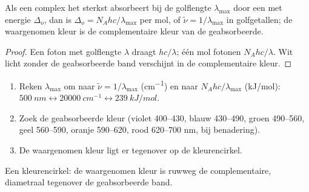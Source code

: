 \begin{proposition}\label{prop:b2:ligand-field:colour}
Als een complex het sterkst absorbeert bij de golflengte $\lambda_{\max}$ door een 
met energie $\Delta_o$, dan is $\Delta_o = N_Ahc/\lambda_{\max}$ per mol, of $\tilde\nu = 1/\lambda_{\max}$
in golfgetallen; de waargenomen kleur is de complementaire kleur van de geabsorbeerde.
\end{proposition}

\begin{proof}
Een foton met golflengte $\lambda$ draagt $hc/\lambda$; één mol fotonen $N_Ahc/\lambda$. Wit
licht zonder de geabsorbeerde band verschijnt in de complementaire kleur.
\end{proof}

\begin{method}\label{met:b2:ligand-field:colour}
\begin{enumerate}
  \item Reken $\lambda_{\max}$ om naar $\tilde\nu = 1/\lambda_{\max}$ (\unit{cm^{-1}}) en naar
        $N_Ahc/\lambda_{\max}$ (\unit{kJ/mol}): $\qty{500}{nm} \leftrightarrow \qty{20000}{cm^{-1}}
        \leftrightarrow \qty{239}{kJ/mol}$.
  \item Zoek de geabsorbeerde kleur (violet 400--430, blauw 430--490, groen 490--560, geel
        560--590, oranje 590--620, rood 620--700 nm, bij benadering).
  \item De waargenomen kleur ligt er tegenover op de kleurencirkel.
\end{enumerate}
\end{method}

\begin{omfigure}

{\small Een kleurencirkel: de waargenomen kleur is ruwweg de complementaire, diametraal
tegenover de geabsorbeerde band.}
\end{omfigure}

